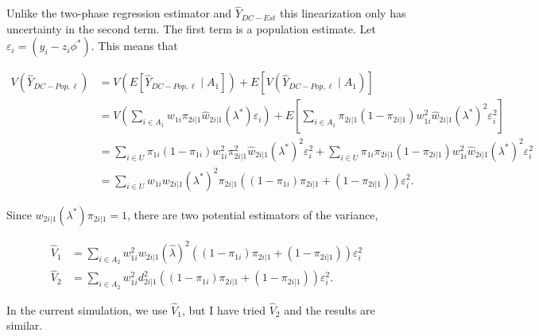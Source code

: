 \documentclass[12pt]{article}
\begin{document}
Unlike the two-phase regression estimator and $\hat Y_{DC-Est}$ this
linearization only has uncertainty in the second term. The first term is a
population estimate. Let $\varepsilon_i = (y_i - z_i \phi^*)$. This means that

\begin{align*}
  V(\hat Y_{DC-Pop, \ell}) 
  &= V(E[\hat Y_{DC-Pop, \ell} \mid A_1]) + E[V(\hat Y_{DC-Pop, \ell} \mid A_1)] \\
  &= V\left(\sum_{i \in A_1} w_{1i} \pi_{2i|1} \hat w_{2i|1}(\lambda^*)
  \varepsilon_i\right) + 
  E\left[\sum_{i \in A_1} \pi_{2i|1}(1 - \pi_{2i|1}) w_{1i}^2 \hat w_{2i|1}(\lambda^*)^2
    \varepsilon_i^2 \right]\\
  &= \sum_{i \in U} \pi_{1i}(1 - \pi_{1i}) w_{1i}^2 \pi_{2i|1}^2 
  \hat w_{2i|1}(\lambda^*)^2 \varepsilon_i^2 +
  \sum_{i \in U} \pi_{1i}\pi_{2i|1}(1 - \pi_{2i|1}) w_{1i}^2 \hat w_{2i|1}(\lambda^*)^2
    \varepsilon_i^2\\
  &= \sum_{i \in U} w_{1i} w_{2i|1}(\lambda^*)^2 \pi_{2i|1}
  ((1 - \pi_{1i})\pi_{2i|1} + (1 - \pi_{2i|1})) \varepsilon_i^2.
\end{align*}

Since $w_{2i|1}(\lambda^*) \pi_{2i|1} = 1$, there are two potential estimators
of the variance,

\begin{align*}
  \hat V_1 &= \sum_{i \in A_2} w_{1i}^2 w_{2i|1}(\hat \lambda)^2 
  ((1 - \pi_{1i})\pi_{2i|1} + (1 - \pi_{2i|1})) \varepsilon_i^2\\
  \hat V_2 &= \sum_{i \in A_2}  w_{1i}^2 d_{2i|1}^2
  ((1 - \pi_{1i})\pi_{2i|1} + (1 - \pi_{2i|1})) \varepsilon_i^2.
\end{align*}

In the current simulation, we use $\hat V_1$, but I have tried $\hat V_2$ and
the results are similar.
\end{document}
